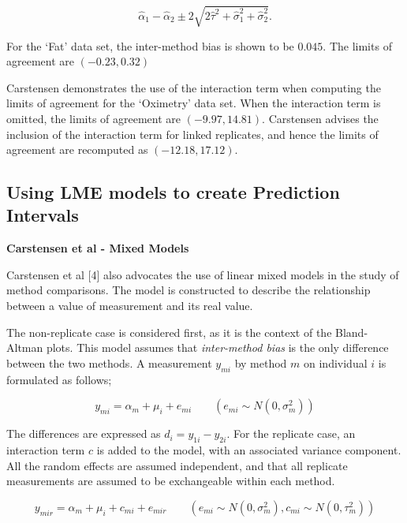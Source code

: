\documentclass[12pt, a4paper]{report}
\theoremstyle{plain}
\theoremstyle{definition}
\theoremstyle{remark}
\begin{document}
\[\hat{\alpha}_1 - \hat{\alpha}_2 \pm 2\sqrt{2\hat{\tau}^2 +\hat{\sigma}_1^2 +\hat{\sigma}_2^2 }.\]

For the `Fat' data set, the inter-method bias is shown to be $0.045$. The limits of agreement are $(-0.23 , 0.32)$

Carstensen demonstrates the use of the interaction term when computing the limits of agreement for the `Oximetry' data set. When the interaction term is omitted, the limits of agreement are $(-9.97, 14.81)$. Carstensen advises the inclusion of the interaction term for linked replicates, and hence the limits of agreement are recomputed as $(-12.18,17.12)$.


\subsection{Using LME models to create Prediction Intervals}

%
\textbf{Carstensen et al - Mixed Models}

Carstensen et al [4] also advocates the use of linear mixed models in the study of method comparisons. The model is constructed to
describe the relationship between a value of measurement and its real value. 

The non-replicate case is considered first, as it is the context of the Bland-Altman plots. 
This model assumes that \textit{inter-method bias} is the only difference between the two methods.
A measurement $y_{mi}$ by method $m$ on individual $i$ is
formulated as follows;


\begin{equation}
y_{mi}  = \alpha_{m} + \mu_{i} + e_{mi} \qquad ( e_{mi} \sim
N(0,\sigma^{2}_{m}))
\end{equation}





The differences are expressed as $d_{i} = y_{1i} - y_{2i}$.
For the
replicate case, an interaction term $c$ is added to the model,
with an associated variance component. 
All the random effects are
assumed independent, and that all replicate measurements are
assumed to be exchangeable within each method.



\begin{equation}
y_{mir}  = \alpha_{m} + \mu_{i} + c_{mi} + e_{mir} \qquad ( e_{mi}
\sim N(0,\sigma^{2}_{m}), c_{mi} \sim N(0,\tau^{2}_{m}))
\end{equation}
\end{document}
